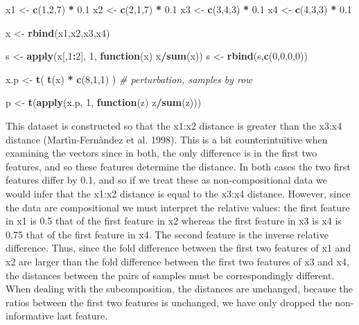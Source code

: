 \documentclass[onecolumn]{article}
\newenvironment{Shaded}{\begin{snugshade}}{\end{snugshade}}
\newcommand{\CommentTok}[1]{\textcolor[rgb]{0.56,0.35,0.01}{\textit{#1}}}
\newcommand{\ControlFlowTok}[1]{\textcolor[rgb]{0.13,0.29,0.53}{\textbf{#1}}}
\newcommand{\DecValTok}[1]{\textcolor[rgb]{0.00,0.00,0.81}{#1}}
\newcommand{\FloatTok}[1]{\textcolor[rgb]{0.00,0.00,0.81}{#1}}
\newcommand{\KeywordTok}[1]{\textcolor[rgb]{0.13,0.29,0.53}{\textbf{#1}}}
\newcommand{\NormalTok}[1]{#1}
\newcommand{\OperatorTok}[1]{\textcolor[rgb]{0.81,0.36,0.00}{\textbf{#1}}}
\newcommand{\StringTok}[1]{\textcolor[rgb]{0.31,0.60,0.02}{#1}}
\begin{document}
\begin{Shaded}
\begin{Highlighting}[]
\NormalTok{x1 <-}\StringTok{ }\KeywordTok{c}\NormalTok{(}\DecValTok{1}\NormalTok{,}\DecValTok{2}\NormalTok{,}\DecValTok{7}\NormalTok{) }\OperatorTok{*}\StringTok{ }\FloatTok{0.1}
\NormalTok{x2 <-}\StringTok{ }\KeywordTok{c}\NormalTok{(}\DecValTok{2}\NormalTok{,}\DecValTok{1}\NormalTok{,}\DecValTok{7}\NormalTok{) }\OperatorTok{*}\StringTok{ }\FloatTok{0.1}
\NormalTok{x3 <-}\StringTok{ }\KeywordTok{c}\NormalTok{(}\DecValTok{3}\NormalTok{,}\DecValTok{4}\NormalTok{,}\DecValTok{3}\NormalTok{) }\OperatorTok{*}\StringTok{ }\FloatTok{0.1}
\NormalTok{x4 <-}\StringTok{ }\KeywordTok{c}\NormalTok{(}\DecValTok{4}\NormalTok{,}\DecValTok{3}\NormalTok{,}\DecValTok{3}\NormalTok{) }\OperatorTok{*}\StringTok{ }\FloatTok{0.1}

\NormalTok{x <-}\StringTok{ }\KeywordTok{rbind}\NormalTok{(x1,x2,x3,x4)}

\NormalTok{s <-}\StringTok{ }\KeywordTok{apply}\NormalTok{(x[,}\DecValTok{1}\OperatorTok{:}\DecValTok{2}\NormalTok{], }\DecValTok{1}\NormalTok{, }\ControlFlowTok{function}\NormalTok{(x) x}\OperatorTok{/}\KeywordTok{sum}\NormalTok{(x))}
\NormalTok{s <-}\StringTok{ }\KeywordTok{rbind}\NormalTok{(s,}\KeywordTok{c}\NormalTok{(}\DecValTok{0}\NormalTok{,}\DecValTok{0}\NormalTok{,}\DecValTok{0}\NormalTok{,}\DecValTok{0}\NormalTok{))}

\NormalTok{x.p <-}\StringTok{ }\KeywordTok{t}\NormalTok{( }\KeywordTok{t}\NormalTok{(x) }\OperatorTok{*}\StringTok{ }\KeywordTok{c}\NormalTok{(}\DecValTok{8}\NormalTok{,}\DecValTok{1}\NormalTok{,}\DecValTok{1}\NormalTok{) ) }\CommentTok{# perturbation, samples by row}

\NormalTok{p <-}\StringTok{ }\KeywordTok{t}\NormalTok{(}\KeywordTok{apply}\NormalTok{(x.p, }\DecValTok{1}\NormalTok{, }\ControlFlowTok{function}\NormalTok{(z) z}\OperatorTok{/}\KeywordTok{sum}\NormalTok{(z)))}
\end{Highlighting}
\end{Shaded}

This dataset is constructed so that the x1:x2 distance is greater than the x3:x4 distance (Martìn-Fernàndez et al. 1998). This is a bit counterintuitive when examining the vectors since in both, the only difference is in the first two features, and so these features determine the distance. In both cases the two first features differ by 0.1, and so if we treat these as non-compositional data we would infer that the x1:x2 distance is equal to the x3:x4 distance. However, since the data are compositional we must interpret the relative values: the first feature in x1 is 0.5 that of the first feature in x2 whereas the first feature in x3 is x4 is 0.75 that of the first feature in x4. The second feature is the inverse relative difference. Thus, since the fold difference between the first two features of x1 and x2 are larger than the fold difference between the first two features of x3 and x4, the distances between the pairs of samples must be correspondingly different. When dealing with the subcomposition, the distances are unchanged, because the ratios between the first two features is unchanged, we have only dropped the non-informative last feature.
\end{document}
